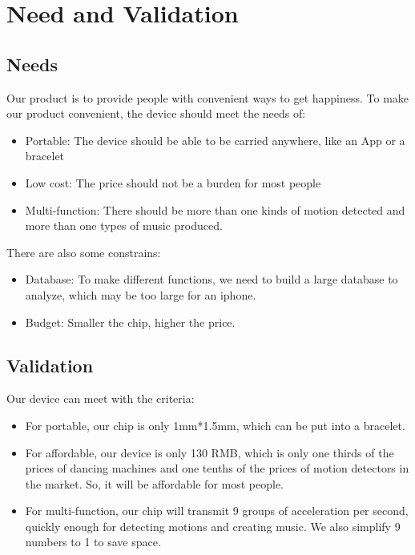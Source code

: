 \section{Need and Validation}

\subsection{Needs}

 Our product is to provide people with convenient ways to get happiness.
 To make our product convenient, the device should meet the needs of:

\begin{itemize}
\item Portable: The device should be able to be carried anywhere, like an App or a bracelet
\item Low cost: The price should not be a burden for most people
\item Multi-function: There should be more than one kinds of motion detected and more than one types of music produced.
\end{itemize}

 There are also some constrains:

\begin{itemize}
\item Database: To make different functions, we need to build a large database to analyze, which may be too large for an iphone.
\item Budget: Smaller the chip, higher the price.
\end{itemize}

\subsection{Validation}

 Our device can meet with the criteria:

\begin{itemize}
\item For portable, our chip is only 1mm*1.5mm, which can be put into a bracelet.
\item For affordable, our device is only 130 RMB, which is only one thirds of the prices of dancing machines and one tenths of the prices of motion detectors in the market.  So, it will be affordable for most people. 
\item For multi-function, our chip will transmit 9 groups of acceleration per second, quickly enough for detecting motions and creating music. We also simplify 9 numbers to 1 to save space.
\end{itemize}
